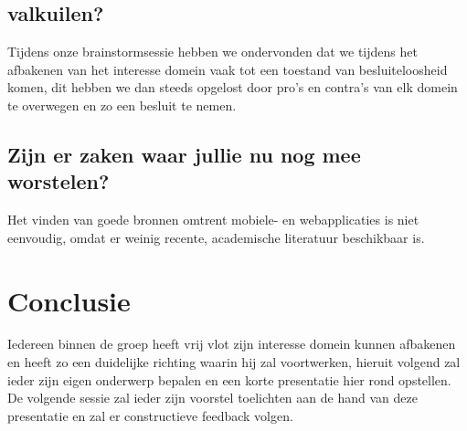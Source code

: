 \documentclass[fleqn,10pt]{voorstel}
\begin{document}
\subsection{valkuilen?}
Tijdens onze brainstormsessie hebben we ondervonden dat we tijdens het afbakenen van het interesse domein vaak tot een toestand van besluiteloosheid komen, dit hebben we dan steeds opgelost door pro's en contra's van elk domein te overwegen en zo een besluit te nemen. 

\subsection{Zijn er zaken waar jullie nu nog mee worstelen?}
Het vinden van goede bronnen omtrent mobiele- en webapplicaties is niet eenvoudig, omdat er weinig recente, academische literatuur beschikbaar is. 

\section{Conclusie}
Iedereen binnen de groep heeft vrij vlot zijn interesse domein kunnen afbakenen en heeft zo een duidelijke richting waarin hij zal voortwerken, hieruit volgend zal ieder zijn eigen onderwerp bepalen en een korte presentatie hier rond opstellen. De volgende sessie zal ieder zijn voorstel toelichten aan de hand van deze presentatie en zal er constructieve feedback volgen.



\end{document}
